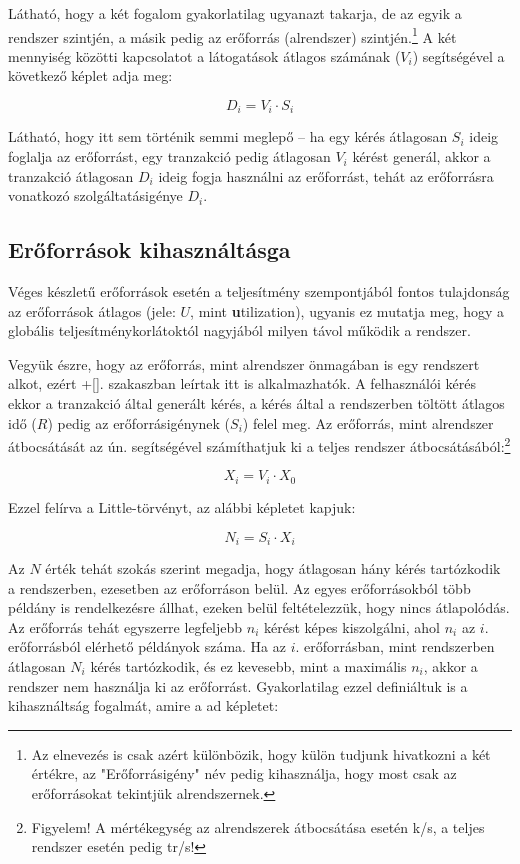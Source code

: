 Látható, hogy a két fogalom gyakorlatilag ugyanazt takarja, de az egyik a rendszer szintjén, a másik pedig az erőforrás (alrendszer) szintjén.\footnote{Az elnevezés is csak azért különbözik, hogy külön tudjunk hivatkozni a két értékre, az "Erőforrásigény" név pedig kihasználja, hogy most csak az erőforrásokat tekintjük alrendszernek.} A két mennyiség közötti kapcsolatot a látogatások átlagos számának ($V_i$) segítségével a következő képlet adja meg:

$$D_i = V_i \cdot S_i$$

Látható, hogy itt sem történik semmi meglepő -- ha egy kérés átlagosan $S_i$ ideig foglalja az erőforrást, egy tranzakció pedig átlagosan $V_i$ kérést generál, akkor a tranzakció átlagosan $D_i$ ideig fogja használni az erőforrást, tehát az erőforrásra vonatkozó szolgáltatásigénye $D_i$.

\subsection{Erőforrások kihasználtásga}

Véges készletű erőforrások esetén a teljesítmény szempontjából fontos tulajdonság az erőforrások átlagos  (jele: $U$, mint \textbf{u}tilization), ugyanis ez mutatja meg, hogy a globális teljesítménykorlátoktól nagyjából milyen távol működik a rendszer.

Vegyük észre, hogy az erőforrás, mint alrendszer önmagában is egy rendszert alkot, ezért \az+\autoref{}. szakaszban leírtak itt is alkalmazhatók. A felhasználói kérés ekkor a tranzakció által generált kérés, a kérés által a rendszerben töltött átlagos idő ($R$) pedig az erőforrásigénynek ($S_i$) felel meg. Az erőforrás, mint alrendszer átbocsátását az ún.  segítségével számíthatjuk ki a teljes rendszer átbocsátásából:\footnote{Figyelem! A mértékegység az alrendszerek átbocsátása esetén k/s, a teljes rendszer esetén pedig tr/s!}

$$X_i = V_i \cdot X_0$$

Ezzel felírva a Little-törvényt, az alábbi képletet kapjuk:

$$N_i = S_i \cdot X_i$$

Az $N$ érték tehát szokás szerint megadja, hogy átlagosan hány kérés tartózkodik a rendszerben, ezesetben az erőforráson belül. Az egyes erőforrásokból több példány is rendelkezésre állhat, ezeken belül feltételezzük, hogy nincs átlapolódás. Az erőforrás tehát egyszerre legfeljebb $n_i$ kérést képes kiszolgálni, ahol $n_i$ az $i.$ erőforrásból elérhető példányok száma. Ha az $i.$ erőforrásban, mint rendszerben átlagosan $N_i$ kérés tartózkodik, és ez kevesebb, mint a maximális $n_i$, akkor a rendszer nem használja ki az erőforrást. Gyakorlatilag ezzel definiáltuk is a kihasználtság fogalmát, amire a  ad képletet:

